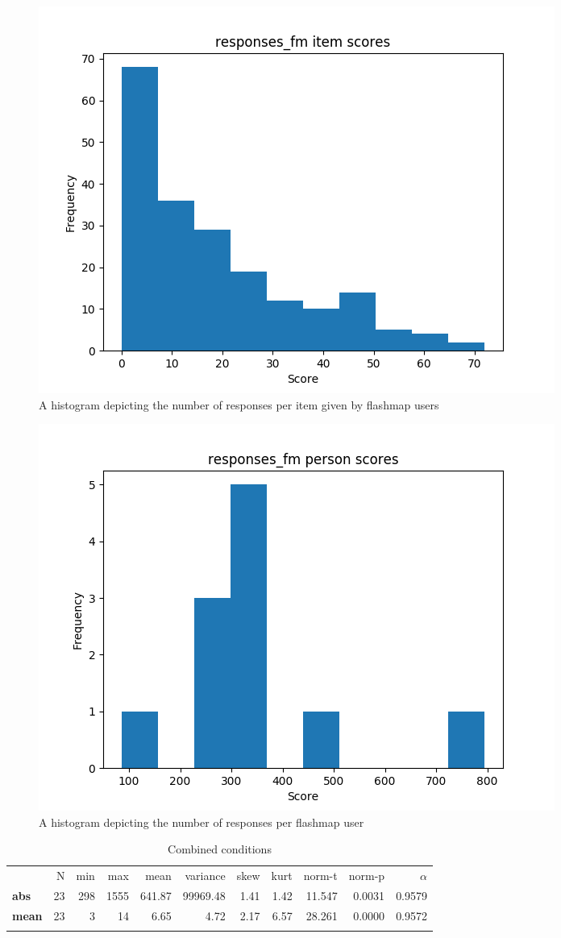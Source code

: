 \begin{figure}
    \centering
\includegraphics[width=.7\textwidth]{img/responses_fm_diff.png}
    \caption{A histogram depicting the number of responses per item given by flashmap users}
    \label{fig:responses_fm_diff}
\end{figure}
\begin{figure}
    \centering
    \includegraphics[width=.7\textwidth]{img/responses_fm_abil.png}
    \caption{A histogram depicting the number of responses per flashmap user}
    \label{fig:responses_fm_abil}
\end{figure}

\begin{longtable}[c]{@{}lrrrrrrrrrr@{}}
\caption{Combined conditions}
\endfirsthead
\toprule\addlinespace
& N & min & max & mean & variance & skew & kurt & norm-t &
norm-p & $\alpha$
\\\addlinespace
\midrule
\textbf{abs} & 23 & 298 & 1555 & 641.87 & 99969.48 & 1.41 & 1.42 &
11.547 & 0.0031 & 0.9579
\\\addlinespace
\textbf{mean} & 23 & 3 & 14 & 6.65 & 4.72 & 2.17 & 6.57 & 28.261 &
0.0000 & 0.9572
\\\addlinespace
\bottomrule
    \label{tab:responses_gen}
\end{longtable}

